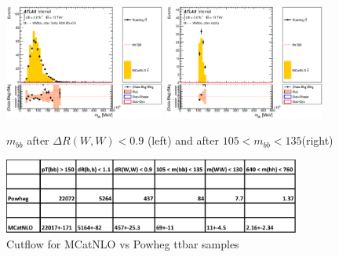 \begin{figure}[!h]
\begin{center}
\includegraphics*[width=0.47\textwidth] {figures/MCatNLO/C_opt700_bbpt150_drbb11_drww09_bbMass.eps}
\includegraphics*[width=0.47\textwidth] {figures/MCatNLO/C_opt700_bbpt150_drbb11_drww09_mbb_bbMass.eps}
\caption[$m_{bb}$ after $\Delta R(W,W) < 0.9$ (left) and after $105<m_{bb}<135$ (right)] {$m_{bb}$ after $\Delta R(W,W) < 0.9$ (left) and after $105<m_{bb}<135$(right)}
\end{center}
\end{figure}

\begin{figure}[!h]
\begin{center}
\includegraphics*[width=0.87\textwidth] {figures/MCatNLO/MCatNLO_vs_Powheg_Cutflow.pdf}
\caption[Cutflow for MCatNLO vs Powheg ttbar samples]{Cutflow for MCatNLO vs Powheg ttbar samples}
\label{fig:mcatnlo_cutflow}
\end{center}
\end{figure}
